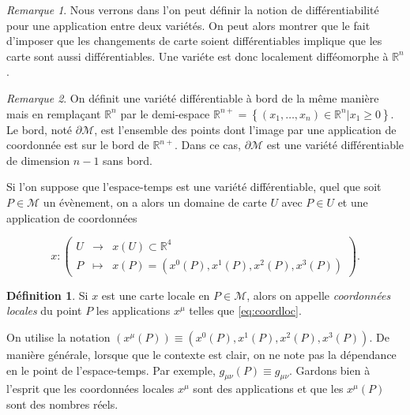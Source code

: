 \documentclass[a4paper,11pt]{report}
\theoremstyle{definition}
\theoremstyle{plain}
\theoremstyle{definition}
\newtheorem{defn}{Définition}[chapter]
\theoremstyle{remark}
\newtheorem{rmk}{Remarque}[chapter]
\newcommand{\M}{\mathscr{M}}
\newcommand{\p}{\partial}
\begin{document}
            \begin{rmk}
                 Nous verrons dans l'on peut définir la notion de différentiabilité  pour une application entre deux variétés. On peut alors montrer que le fait d'imposer que les changements de carte soient différentiables implique que les carte sont aussi différentiables. Une variéte est donc localement difféomorphe à $\mathbb{R}^n$.
            \end{rmk}
            
            \begin{rmk}
                On définit une variété différentiable à bord de la même manière mais en remplaçant $\mathbb{R}^n$ par le demi-espace $\mathbb{R}^{n+}=\left\{(x_1,\dots,x_n)\in\mathbb{R}^n|x_1\geq 0\right\}$. Le bord, noté $\p\M$, est l'ensemble des points dont l'image par une application de coordonnée est sur le bord de $\mathbb{R}^{n+}$. Dans ce cas, $\p\M$ est une variété différentiable de dimension $n-1$ sans bord.
            \end{rmk}
            
            Si l'on suppose que l'espace-temps est une variété différentiable, quel que soit $P\in\M$ un évènement, on a alors un domaine de carte $U$ avec $P\in U$ et une application de coordonnées
            
            \begin{equation}\label{eq:coordloc}
            x:\left(
            \begin{array}{ccc}
                U & \longrightarrow & x(U) \subset \mathbb{R}^4  \\
                P & \longmapsto & x(P) = (x^0(P), x^1(P) , x^2(P), x^3(P))
            \end{array}
            \right).
            \end{equation}
            
            \begin{defn}
                Si $x$ est une carte locale en $P\in\M$, alors on appelle \textit{coordonnées locales} du point $P$ les applications $x^\mu$ telles que \ref{eq:coordloc}.
            \end{defn}
            
            On utilise la notation $(x^\mu(P)) \equiv (x^0(P),x^1(P),x^2(P),x^3(P))$. De manière générale, lorsque que le contexte est clair, on ne note pas la dépendance en le point de l'espace-temps. Par exemple, $g_{\mu\nu}(P)\equiv g_{\mu\nu}$. Gardons bien à l'esprit que les coordonnées locales $x^\mu$ sont des applications et que les $x^\mu(P)$ sont des nombres réels. 
            
\end{document}
